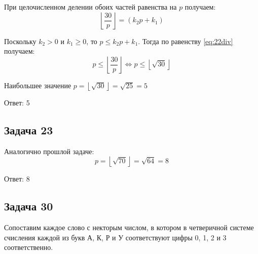 \documentclass[12pt, a4paper]{article}
\begin{document}
  При целочисленном делении обоих частей равенства на $ p $ получаем:
  \begin{equation}
    \label{eq:22div}
    \left\lfloor \frac{30}{p} \right\rfloor = (k_2p + k_1)
  \end{equation}

  Поскольку $ k_2 > 0 $ и $ k_1 \ge 0 $, то $ p \le k_2p + k_1 $. 
  Тогда по равенству \eqref{eq:22div} получаем: 
  \begin{equation*}
    p \le \left\lfloor \frac{30}{p} \right\rfloor \Longleftrightarrow p \le \left\lfloor \sqrt{30} \right\rfloor
  \end{equation*}

  Наибольшее значение $ p = \left\lfloor \sqrt{30} \right\rfloor = \sqrt{25} = 5 $

  Ответ: 5

  \subsection{Задача 23}
  Аналогично прошлой задаче:
  \begin{equation*}
    p = \left\lfloor \sqrt{70} \right\rfloor = \sqrt{64} = 8
  \end{equation*}

  Ответ: 8

  \subsection{Задача 30}
  Сопоставим каждое слово с некторым числом, в котором в четверичной системе 
  счисления каждой из букв А, К, Р и У соответствуют цифры 0, 1, 2 и 3
  соответственно.
\end{document}
